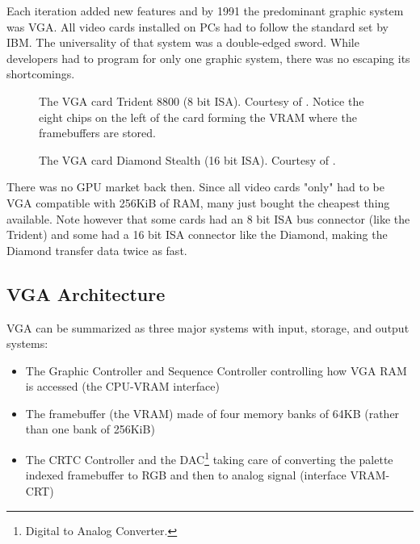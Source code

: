 \documentclass[book.tex]{subfiles}
\begin{document}
Each iteration added new features and by 1991 the predominant graphic system was VGA. All video cards installed on PCs had to follow the standard set by IBM. The universality of that system was a double-edged sword. While developers had to program for only one graphic system, there was no escaping its shortcomings.\\

\begin{figure}[H] 
  \centering 
  \caption{The VGA card Trident 8800 (8 bit ISA). Courtesy of . Notice the eight chips on the left of the card forming the VRAM where the framebuffers are stored\protect\footnotemark.}
\end{figure}
\par
\begin{figure}[H] 
  \centering 
  \caption{The VGA card Diamond Stealth (16 bit ISA). Courtesy of .}
\end{figure}

 There was no GPU market back then. Since all video cards "only" had to be VGA compatible with 256KiB of RAM, many just bought the cheapest thing available. Note however that some cards had an 8 bit ISA bus connector (like the Trident) and some had a 16 bit ISA connector like the Diamond, making the Diamond transfer data twice as fast.\\
\par




\subsection{VGA Architecture}

VGA can be summarized as three major systems with input, storage, and output systems:\\

\begin{itemize}
\item The Graphic Controller and Sequence Controller controlling how VGA RAM is accessed (the CPU-VRAM interface)
\item The framebuffer (the VRAM) made of four memory banks of 64KB (rather than one bank of 256KiB)
\item The CRTC Controller and the DAC\footnote{Digital to Analog Converter.} taking care of converting the palette indexed framebuffer to RGB and then to analog signal (interface VRAM-CRT)
\end{itemize}
\end{document}
